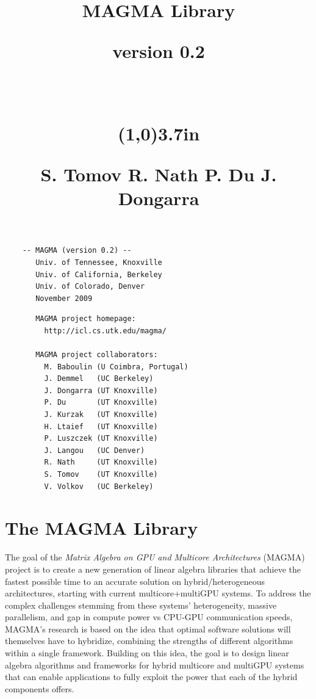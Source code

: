 \documentclass[10pt]{book}
\title{\Huge{{\bf MAGMA}} Library\\
       {\begin{flushleft} 
         \hspace{25mm} {\large version 0.2}
        \end{flushleft}
       }\\
       {\begin{flushright}
          \vspace{-0.4in} 
          \line(1,0){3.7in}
        \\
        \vspace{0.4in} 
        \begin{minipage}[bottom]{3.7in}
          {\large
            S. Tomov \hh R. Nath \hh P. Du \hh J. Dongarra
          }
        \end{minipage}
        \end{flushright}
       }
      }
\date{}
\begin{document}
\maketitle


\vspace{2in}
\begin{verbatim}
    -- MAGMA (version 0.2) --
       Univ. of Tennessee, Knoxville
       Univ. of California, Berkeley
       Univ. of Colorado, Denver
       November 2009
\end{verbatim}


\vspace{0.2in}
\begin{verbatim}
       MAGMA project homepage: 
         http://icl.cs.utk.edu/magma/

       MAGMA project collaborators:
         M. Baboulin (U Coimbra, Portugal)
         J. Demmel   (UC Berkeley)
         J. Dongarra (UT Knoxville)
         P. Du       (UT Knoxville)
         J. Kurzak   (UT Knoxville)
         H. Ltaief   (UT Knoxville)
         P. Luszczek (UT Knoxville)
         J. Langou   (UC Denver)
         R. Nath     (UT Knoxville)
         S. Tomov    (UT Knoxville)
         V. Volkov   (UC Berkeley)
\end{verbatim}


% 
%

\tableofcontents

\chapter{The MAGMA Library}

The goal of the {\it Matrix Algebra on GPU and Multicore Architectures}
(MAGMA) project is to create a new generation of linear algebra libraries 
that achieve the fastest possible time to an accurate solution on 
hybrid/heterogeneous architectures, starting with 
current multicore+multiGPU systems. To address the complex challenges 
stemming from these systems' heterogeneity, massive parallelism, and gap 
in compute power vs CPU-GPU communication speeds, MAGMA's research is based 
on the idea that optimal software solutions will
themselves have to hybridize, combining the strengths of different algorithms
within a single framework. Building on this idea, the goal is to design 
linear algebra algorithms and frameworks for hybrid multicore and multiGPU 
systems that can enable applications to fully exploit the power that each 
of the hybrid components offers.
\end{document}
